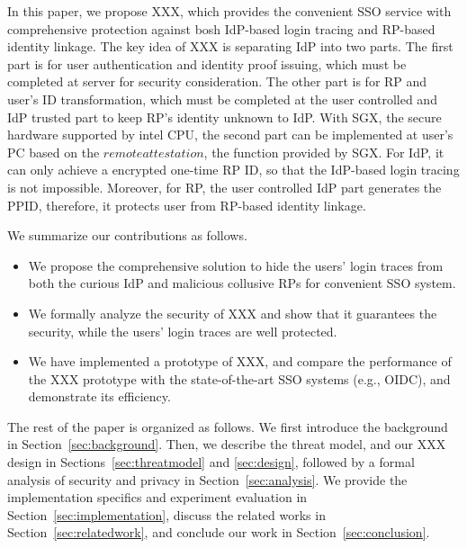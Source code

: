 In this paper, we propose XXX, which provides the convenient SSO service with comprehensive protection against bosh IdP-based login tracing and RP-based identity linkage. The key idea of XXX is separating IdP into two parts. The first part is for user authentication and identity proof issuing, which must be completed at server for security consideration. The other part is for RP and user's ID transformation, which must be completed at the user controlled and IdP trusted part to keep RP's identity unknown to IdP. With SGX, the secure hardware supported by intel CPU, the second part can be implemented at user's PC based on the $remote attestation$, the function provided by SGX. For IdP, it can only achieve a encrypted one-time RP ID, so that the IdP-based login tracing is not impossible. Moreover, for RP, the user controlled IdP part generates the PPID, therefore, it protects user from RP-based identity linkage.

We summarize our contributions as follows.
\begin{itemize}
\item We propose the comprehensive solution to hide the users' login traces from both the curious IdP and malicious collusive RPs for convenient SSO system.
\item We formally analyze the security of XXX and show that it guarantees the security, while the users' login traces are well protected.
\item We have implemented a prototype of XXX, and compare the performance of the XXX prototype with the state-of-the-art SSO systems (e.g., OIDC), and demonstrate its efficiency.
\end{itemize}

The rest of the paper is organized as follows. We first introduce the background in Section~\ref{sec:background}. Then, we describe the threat model, and our XXX design in Sections~\ref{sec:threatmodel} and \ref{sec:design}, followed by a formal analysis of security and privacy in Section~\ref{sec:analysis}. We provide the implementation specifics and experiment evaluation in Section~\ref{sec:implementation}, discuss the related works in Section~\ref{sec:relatedwork}, and conclude our work in Section~\ref{sec:conclusion}.
